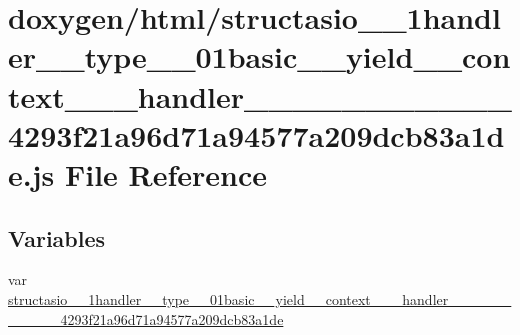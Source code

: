 \hypertarget{structasio__1__1handler____type__3__01basic____yield____context__3__01__handler__01__4__00__01__f15ff47d30f1cfeae33bcea3e258896e}{}\section{doxygen/html/structasio\+\_\+\_\+1handler\+\_\+\+\_\+type\+\_\+\_\+01basic\+\_\+\+\_\+yield\+\_\+\+\_\+context\+\_\+\_\+\_\+handler\+\_\+\_\+\_\+\_\+\_\+\_\+\_\+\_\+\_\+\_\+\_\+4293f21a96d71a94577a209dcb83a1de.js File Reference}
\label{structasio__1__1handler____type__3__01basic____yield____context__3__01__handler__01__4__00__01__f15ff47d30f1cfeae33bcea3e258896e}
\subsection*{Variables}
\begin{DoxyCompactItemize}
\item 
var \hyperlink{structasio__1__1handler____type__3__01basic____yield____context__3__01__handler__01__4__00__01__f15ff47d30f1cfeae33bcea3e258896e_a0cc870110f2c9387299d42ad138ce4fa}{structasio\+\_\+\_\+1handler\+\_\+\+\_\+type\+\_\+\_\+01basic\+\_\+\+\_\+yield\+\_\+\+\_\+context\+\_\+\_\+\_\+handler\+\_\+\_\+\_\+\_\+\_\+\_\+\_\+\_\+\_\+\_\+\_\+4293f21a96d71a94577a209dcb83a1de}
\end{DoxyCompactItemize}


